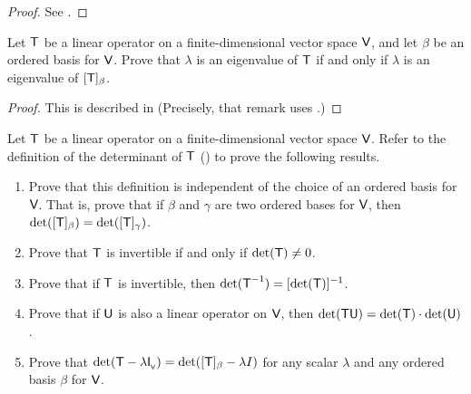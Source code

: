 \begin{proof}
See .
\end{proof}

\begin{exercise} \label{exercise 5.1.7}
Let \(\textsf{T}\) be a linear operator on a finite-dimensional vector space \(\textsf{V}\), and let \(\beta\) be an ordered basis for \(\textsf{V}\).
Prove that \(\lambda\) is an eigenvalue of \(\textsf{T}\) if
and only if \(\lambda\) is an eigenvalue of \([\textsf{T}]_{\beta}\).
\end{exercise}

\begin{proof}
This is described in  (Precisely, that remark uses .)
\end{proof}

\begin{exercise} \label{exercise 5.1.8}
Let \(\textsf{T}\) be a linear operator on a finite-dimensional vector space \(\textsf{V}\).
Refer to the definition of the determinant of \(\textsf{T}\) () to prove the following results.
\begin{enumerate}
\item Prove that this definition is independent of the choice of an ordered basis for \(\textsf{V}\).
That is, prove that if \(\beta\) and \(\gamma\) are two ordered bases for \(\textsf{V}\), then \(\det([\textsf{T}]_{\beta}) = \det([\textsf{T}]_{\gamma})\).
\item Prove that \(\textsf{T}\) is invertible if and only if \(\det(\textsf{T}) \ne 0\).
\item Prove that if \(\textsf{T}\) is invertible, then \(\det(\textsf{T}^{-1}) = [\det(\textsf{T})]^{-1}\).
\item Prove that if \(\textsf{U}\) is also a linear operator on \(\textsf{V}\), then \(\det(\textsf{T}\textsf{U}) = \det(\textsf{T}) \cdot \det(\textsf{U})\).
\item Prove that \(\det(\textsf{T} - \lambda \textsf{I}_{_{\textsf{V}}}) = \det([\textsf{T}]_{\beta} - \lambda I)\) for any scalar \(\lambda\) and any ordered basis \(\beta\) for \(\textsf{V}\).
\end{enumerate}
\end{exercise}


